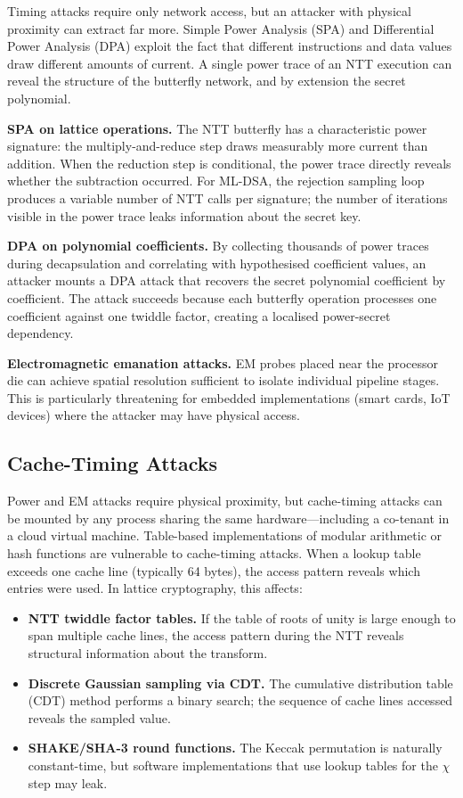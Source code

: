 Timing attacks require only network access, but an attacker with physical proximity can extract far more.  Simple Power Analysis (SPA) and Differential Power Analysis (DPA) exploit the fact that different instructions and data values draw different amounts of current.  A single power trace of an NTT execution can reveal the structure of the butterfly network, and by extension the secret polynomial.

\textbf{SPA on lattice operations.}  The NTT butterfly has a characteristic power signature: the multiply-and-reduce step draws measurably more current than addition.  When the reduction step is conditional, the power trace directly reveals whether the subtraction occurred.  For ML-DSA, the rejection sampling loop produces a variable number of NTT calls per signature; the number of iterations visible in the power trace leaks information about the secret key.

\textbf{DPA on polynomial coefficients.}  By collecting thousands of power traces during decapsulation and correlating with hypothesised coefficient values, an attacker mounts a DPA attack that recovers the secret polynomial coefficient by coefficient.  The attack succeeds because each butterfly operation processes one coefficient against one twiddle factor, creating a localised power-secret dependency.

\textbf{Electromagnetic emanation attacks.}  EM probes placed near the processor die can achieve spatial resolution sufficient to isolate individual pipeline stages.  This is particularly threatening for embedded implementations (smart cards, IoT devices) where the attacker may have physical access.

\subsection{Cache-Timing Attacks}
\label{subsec:cache-timing}

Power and EM attacks require physical proximity, but cache-timing attacks can be mounted by any process sharing the same hardware---including a co-tenant in a cloud virtual machine.  Table-based implementations of modular arithmetic or hash functions are vulnerable to cache-timing attacks.  When a lookup table exceeds one cache line (typically 64 bytes), the access pattern reveals which entries were used.  In lattice cryptography, this affects:

\begin{itemize}
\item \textbf{NTT twiddle factor tables.}  If the table of roots of unity is large enough to span multiple cache lines, the access pattern during the NTT reveals structural information about the transform.
\item \textbf{Discrete Gaussian sampling via CDT.}  The cumulative distribution table (CDT) method performs a binary search; the sequence of cache lines accessed reveals the sampled value.
\item \textbf{SHAKE/SHA-3 round functions.}  The Keccak permutation is naturally constant-time, but software implementations that use lookup tables for the $\chi$ step may leak.
\end{itemize}

